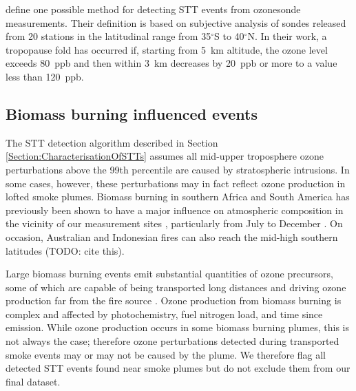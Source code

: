 \documentclass{article}
\begin{document}
    \citet{Tang2010} define one possible method for detecting STT events from ozonesonde measurements. 
    Their definition is based on subjective analysis of sondes released from 20 stations in the latitudinal range from 35$^\circ$S to 40$^\circ$N.
    In their work, a tropopause fold has occurred if, starting from 5~km altitude, the ozone level exceeds 80~ppb and then within 3~km decreases by 20~ppb or more to a value less than 120~ppb.

  \subsection{Biomass burning influenced events}
  \label{Section:BiomassBurning}
    The STT detection algorithm described in Section \ref{Section:CharacterisationOfSTTs} assumes all mid-upper troposphere ozone perturbations above the 99th percentile are caused by stratospheric intrusions. 
    In some cases, however, these perturbations may in fact reflect ozone production in lofted smoke plumes.
    Biomass burning in southern Africa and South America has previously been shown to have a major influence on atmospheric composition in the vicinity of our measurement sites \citep{Gloudemans2006, Edwards2006}, particularly from July to December \citep{Pak2003}.
    On occasion, Australian and Indonesian fires can also reach the mid-high southern latitudes (TODO: cite this).
    
    Large biomass burning events emit substantial quantities of ozone precursors, some of which are capable of being transported long distances and driving ozone production far from the fire source \citep{Jaffe_2012}.
    Ozone production from biomass burning is complex and affected by photochemistry, fuel nitrogen load, and time since emission. 
    While ozone production occurs in some biomass burning plumes, this is not always the case; therefore ozone perturbations detected during transported smoke events may or may not be caused by the plume.
    We therefore flag all detected STT events found near smoke plumes but do not exclude them from our final dataset.
    
    
\end{document}
